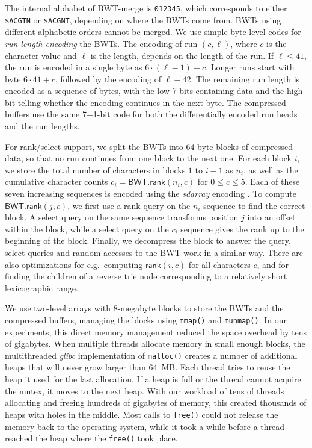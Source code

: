 \documentclass[smallabstract,smallcaptions]{dccpaper}
\newcommand{\BWT}{\textsf{BWT}}
\newcommand{\mBWT}{\ensuremath{\mathsf{BWT}}}
\newcommand{\rank}{\textsf{rank}}
\newcommand{\select}{\textsf{select}}
\newcommand{\mrank}{\ensuremath{\mathsf{rank}}}
\newcommand{\BWTmerge}{\textsf{BWT\nobreakdash-merge}}
\begin{document}
The internal alphabet of \BWTmerge{} is \texttt{012345}, which corresponds to either \texttt{\$ACGTN} or \texttt{\$ACGNT}, depending on where the \BWT{}s come from. \BWT{}s using different alphabetic orders cannot be merged. We use simple byte-level codes for \emph{run-length encoding} the \BWT{}s. The encoding of run $(c, \ell)$, where $c$ is the character value and $\ell$ is the length, depends on the length of the run. If $\ell \le 41$, the run is encoded in a single byte as $6 \cdot (\ell-1) + c$. Longer runs start with byte $6 \cdot 41 + c$, followed by the encoding of $\ell-42$. The remaining run length is encoded as a sequence of bytes, with the low 7 bits containing data and the high bit telling whether the encoding continues in the next byte. The compressed buffers use the same 7+1\nobreakdash-bit code for both the differentially encoded run heads and the run lengths.

For \rank/\select{} support, we split the \BWT{}s into 64\nobreakdash-byte blocks of compressed data, so that no run continues from one block to the next one. For each block $i$, we store the total number of characters in blocks $1$ to $i-1$ as $n_{i}$, as well as the cumulative character counts $c_{i} = \mBWT.\mrank(n_{i},c)$ for $0 \le c \le 5$. Each of these seven increasing sequences is encoded using the \emph{sdarray} encoding \cite{Okanohara2007}. To compute $\mBWT.\mrank(j,c)$, we first use a \rank{} query on the $n_{i}$ sequence to find the correct block. A \select{} query on the same sequence transforms position $j$ into an offset within the block, while a \select{} query on the $c_{i}$ sequence gives the rank up to the beginning of the block. Finally, we decompress the block to answer the query. \select{} queries and random accesses to the \BWT{} work in a similar way. There are also optimizations for e.g.~computing $\mrank(i,c)$ for all characters $c$, and for finding the children of a reverse trie node corresponding to a relatively short lexicographic range.

We use two-level arrays with 8\nobreakdash-megabyte blocks to store the \BWT{}s and the compressed buffers, managing the blocks using \texttt{mmap()} and \texttt{munmap()}. In our experiments, this direct memory management reduced the space overhead by tens of gigabytes. When multiple threads allocate memory in small enough blocks, the multithreaded \emph{glibc} implementation of \texttt{malloc()} creates a number of additional heaps that will never grow larger than 64~MB. Each thread tries to reuse the heap it used for the last allocation. If a heap is full or the thread cannot acquire the mutex, it moves to the next heap. With our workload of tens of threads allocating and freeing hundreds of gigabytes of memory, this created thousands of heaps with holes in the middle. Most calls to \texttt{free()} could not release the memory back to the operating system, while it took a while before a thread reached the heap where the \texttt{free()} took place.
\end{document}
